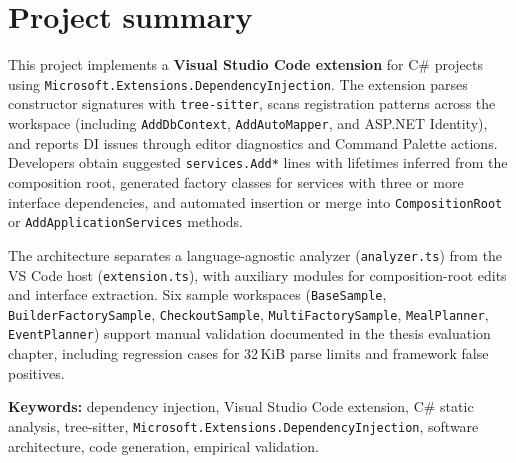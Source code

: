 \chapter*{Project summary}
\label{summary}

This project implements a \textbf{Visual Studio Code extension} for C\# projects using \texttt{Microsoft.Extensions.DependencyInjection}. The extension parses constructor signatures with \texttt{tree-sitter}, scans registration patterns across the workspace (including \texttt{AddDbContext}, \texttt{AddAutoMapper}, and ASP.NET Identity), and reports DI issues through editor diagnostics and Command Palette actions. Developers obtain suggested \texttt{services.Add*} lines with lifetimes inferred from the composition root, generated factory classes for services with three or more interface dependencies, and automated insertion or merge into \texttt{CompositionRoot} or \texttt{AddApplicationServices} methods.

The architecture separates a language-agnostic analyzer (\texttt{analyzer.ts}) from the VS Code host (\texttt{extension.ts}), with auxiliary modules for composition-root edits and interface extraction. Six sample workspaces (\texttt{BaseSample}, \texttt{BuilderFactorySample}, \texttt{CheckoutSample}, \texttt{MultiFactorySample}, \texttt{MealPlanner}, \texttt{EventPlanner}) support manual validation documented in the thesis evaluation chapter, including regression cases for 32\,KiB parse limits and framework false positives.

\textbf{Keywords:} dependency injection, Visual Studio Code extension, C\# static analysis, tree-sitter, \texttt{Microsoft.Extensions.DependencyInjection}, software architecture, code generation, empirical validation.
